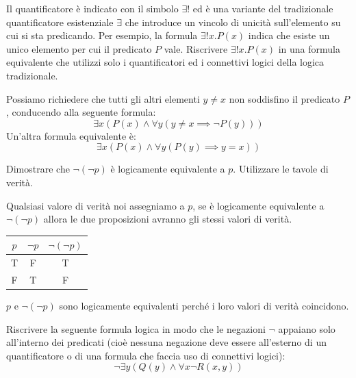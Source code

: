 
\begin{esercizio}
Il quantificatore  è indicato con il simbolo $\exists!$ ed è una variante del tradizionale quantificatore esistenziale $\exists$ che introduce un vincolo di unicità sull’elemento su cui si sta predicando.
Per esempio, la formula $\exists!x.P(x)$ indica che esiste un unico elemento per cui il predicato $P$ vale.
Riscrivere $\exists!x.P(x)$ in una formula equivalente che utilizzi solo i quantificatori ed i connettivi logici della logica tradizionale.
\end{esercizio}

\begin{soluzione}
Possiamo richiedere che tutti gli altri elementi $y\neq x$ non soddisfino il predicato $P$, conducendo alla seguente formula:
$$\exists x (P(x) \land \forall y (y\neq x \implies \neg P(y)))$$
Un'altra formula equivalente è:
$$\exists x (P(x) \land \forall y (P(y)\implies y = x))$$
\end{soluzione}

\begin{esercizio}    
Dimostrare che $\neg (\neg p)$ è logicamente equivalente a $p$. Utilizzare le tavole di verità. 
\end{esercizio}

\begin{soluzione}
Qualsiasi valore di verità noi assegniamo a $p$, se è logicamente equivalente a $\neg (\neg p)$ allora le due proposizioni avranno gli stessi valori di verità. 

\begin{center}
    \begin{tabular}{|c|c|c|}
        \hline 
        $p$ & $\neg p$ & $\neg (\neg p)$ \\
        \hline 
        T & F & T \\
        \hline 
        F & T & F \\	
        \hline 
    \end{tabular}
\end{center}
$p$ e $\neg (\neg p)$ sono logicamente equivalenti perché i loro valori di verità coincidono.\\
\end{soluzione}


\begin{esercizio}
Riscrivere la seguente formula logica in modo che le negazioni $\neg$ appaiano solo all'interno dei predicati (cioè nessuna negazione deve essere all'esterno di un quantificatore o di una formula che faccia uso di connettivi logici):
$$\neg\exists y (Q(y) \land \forall x \neg R(x,y))$$
\end{esercizio}

